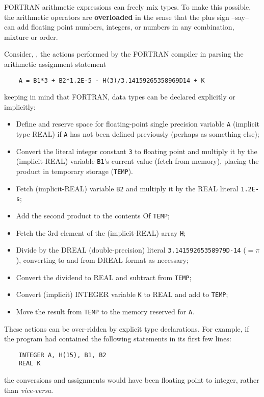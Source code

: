 FORTRAN arithmetic expressions can freely mix types. To make this possible, the arithmetic operators are \textbf{overloaded} in the sense that the plus sign --say-- can add floating point numbers, integers, or numbers in any combination, mixture or order.

Consider, \eg, the actions performed by the FORTRAN compiler in parsing the arithmetic assignment statement 

\begin{verbatim}
    A = B1*3 + B2*1.2E-5 - H(3)/3.14159265358969D14 + K
\end{verbatim}

keeping in mind that FORTRAN, data types can be declared explicitly or implicitly:
\begin{itemize}
    \item Define and reserve space for floating-point single precision variable \verb|A| (implicit type REAL) if \verb|A| has not been defined previously (perhaps as something else);
    \item Convert the literal integer constant \verb|3| to floating point and multiply it by the (implicit-REAL) variable \verb|B1|'s current value (fetch from memory), placing the product in temporary storage (\verb|TEMP|).
    \item Fetch (implicit-REAL) variable \verb|B2| and multiply it by the REAL literal \verb|1.2E-s|;
    \item Add the second product to the contents Of \verb|TEMP|;
    \item Fetch the 3rd element of the (implicit-REAL) array \verb|H|;
    \item Divide by the DREAL (double-precision) literal \verb|3.14159265358979D-14| ($= \pi$ ), converting to and from DREAL format as necessary;
    \item Convert the dividend to REAL and subtract from \verb|TEMP|;
    \item Convert (implicit) INTEGER variable \verb|K| to REAL and add to \verb|TEMP|;
    \item Move the result from \verb|TEMP| to the memory reserved for \verb|A|.
\end{itemize}

These actions can be over-ridden by explicit type declarations. For example, if the program had contained the following statements in its first few lines:
\begin{verbatim}
    INTEGER A, H(15), B1, B2 
    REAL K
\end{verbatim}
the conversions and assignments would have been floating point to integer, rather than \textit{vice-versa}.

